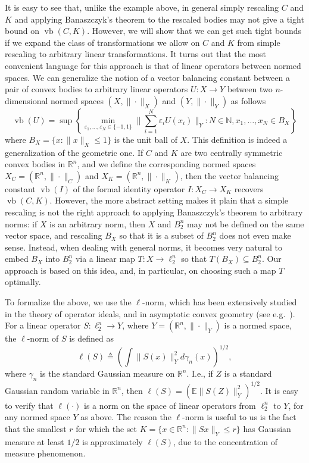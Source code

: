 \documentclass[11pt]{article}
\newcommand{\R}{{\mathbb{R}}}
\newcommand{\E}{\mathbb{E}}
\newcommand\eps{\varepsilon}
\newcommand{\eqdef}{\triangleq}
\DeclareMathOperator{\vb}{vb}
\begin{document}
It is easy to see that, unlike the example above, in general simply
rescaling $C$ and $K$ and applying Banaszczyk's theorem to the
rescaled bodies may not give a tight bound on $\vb(C, K)$. However, we
will show that we can get such tight bounds if we expand the class of
transformations we allow on $C$ and $K$ from simple rescaling to
arbitrary linear transformations.  It turns out that the most
convenient language for this approach is that of linear operators
between normed spaces. We can generalize the notion of a vector
balancing constant between a pair of convex bodies to arbitrary linear
operators $U:X \to Y$ between two $n$-dimensional normed spaces $(X,
\| \cdot\|_X)$ and $(Y, \| \cdot\|_Y)$ as follows
\begin{equation}\label{eq:vb-oper}
\vb(U) = \sup\left\{
  \min_{\eps_1, \ldots, \eps_N \in \{-1, 1\}} 
  \biggl\|\sum_{i = 1}^N \eps_i U(x_i)\biggr\|_Y:
  N \in \mathbb{N}, x_1, \ldots, x_N \in B_X\right\}
\end{equation}
where $B_X = \{x: \|x\|_X \le 1\}$ is the unit ball of $X$.  This
definition is indeed a generalization of the geometric one. If $C$ and
$K$ are two centrally symmetric convex bodies in $\R^n$, and we define
the corresponding normed spaces $X_C = (\R^n, \|\cdot\|_C)$ and $X_K =
(\R^n, \|\cdot\|_K)$, then the vector balancing constant $\vb(I)$ of
the formal identity operator $I:X_C \to X_K$ recovers $\vb(C,
K)$. However, the more abstract setting makes it plain that a simple
rescaling is not the right approach to applying Banaszczyk's theorem
to arbitrary norms: if $X$ is an arbitrary norm, then $X$ and $B_2^n$
may not be defined on the same vector space, and rescaling $B_X$ so
that it is a subset of $B_2^n$ does not even make sense. Instead, when
dealing with general norms, it becomes very natural to embed $B_X$
into $B_2^n$ via a linear map $T:X \to \ell_2^n$
so that $T(B_X) \subseteq B_2^n$. Our approach is
based on this idea, and, in particular, on choosing such a map $T$
optimally.

To formalize the above, we use the
$\ell$-norm, which has been extensively studied in the theory of
operator ideals, and in asymptotic convex geometry (see
e.g.~\cite{TJ-book,Pisier-book,AGM-book}). For a linear operator
$S:\ell_2^n \to Y$, where $Y = (\R^n, \|\cdot\|_Y)$ is a normed space,
the $\ell$-norm of $S$ is defined as
\[
\ell(S) \eqdef \left( \int \|S(x)\|_Y^2 d\gamma_n(x) \right)^{1/2},
\]
where $\gamma_n$ is the standard Gaussian measure on $\R^n$. I.e., if
$Z$ is a standard Gaussian random variable in $\R^n$, then $\ell(S) =
(\E \|S(Z)\|_Y^2)^{1/2}$. It is easy to verify that $\ell(\cdot)$ is a
norm on the space of linear operators from $\ell_2^n$ to $Y$, for any
normed space $Y$ as above. The reason the $\ell$-norm is useful to us
is the fact that the smallest $r$ for which the set $K = \{x \in \R^n:
\|Sx\|_Y \le r\}$  has Gaussian measure at least $1/2$ is approximately
$\ell(S)$, due to the  concentration of measure phenomenon. 
\end{document}
